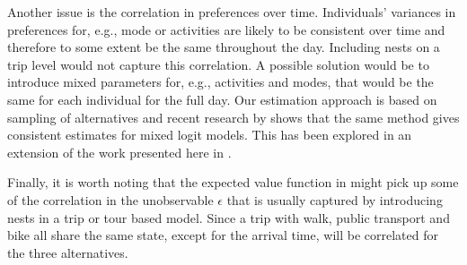  Another issue is the correlation in preferences over time. Individuals' variances in preferences for, e.g., mode or activities are likely to be consistent over time and therefore to some extent be the same throughout the day. Including nests on a trip level would not capture this correlation. A possible solution would be to introduce mixed parameters for, e.g., activities and modes, that would be the same for each individual for the full day. Our estimation approach is based on sampling of alternatives and recent research by \citet{Guevara13} shows that the same method gives consistent estimates for mixed logit models. This has been explored in an extension of the work presented here in \citep{maelleMixed17}.

Finally, it is worth noting that the expected value function in  might pick up some of the correlation in the unobservable $\epsilon$ that is usually captured by introducing nests in a trip or tour based model. Since a trip with walk, public transport and bike all share the same state, except for the arrival time, \eutil will be correlated for the three alternatives.